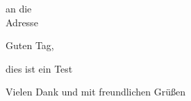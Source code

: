 \documentclass[a4paper,12pt]{scrlttr2}
\begin{document}
\begin{letter}{
an die \\
Adresse\\
}

\opening{Guten Tag,}

dies ist ein Test


\closing{Vielen Dank und mit freundlichen Grü\ss en}


\end{letter}
\end{document}
